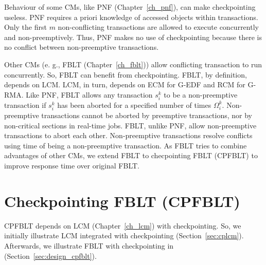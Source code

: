Behaviour of some CMs, like PNF (Chapter~\ref{ch_pnf}), can make checkpointing useless. PNF requires a priori knowledge of accessed objects within transactions. Only the first $m$ non-conflicting transactions are allowed to execute concurrently and non-preemptively. Thus, PNF makes no use of checkpointing because there is no conflict between non-preemptive transactions.

Other CMs (e. g., FBLT (Chapter~\ref{ch_fblt})) allow conflicting transaction to run concurrently. So, FBLT can benefit from checkpointing. FBLT, by definition, depends on LCM. LCM, in turn, depends
on ECM for G-EDF and RCM for G-RMA. Like PNF, FBLT allows any transaction $s_i^k$ to be a non-preemptive transaction if $s_i^k$ has been aborted for a specified number of times $\Omega_i^k$. Non-preemptive transactions cannot be aborted by preemptive transactions, nor by non-critical sections in real-time jobs. FBLT, unlike PNF, allow non-preemptive transactions to abort each other. Non-preemptive transactions resolve conflicts using time of being a non-preemptive transaction. As FBLT  tries to combine advantages of other CMs, we extend FBLT to checpointing FBLT (CPFBLT) to improve response time over original FBLT.
%
\section{Checkpointing FBLT (CPFBLT)}\label{sec:cpfblt_design}
%
CPFBLT depends on LCM (Chapter~\ref{ch_lcm}) with checkpointing. So, we initially illustrate LCM integrated with checkpointing (Section~\ref{sec:cplcm}). Afterwards, we illustrate FBLT with checkpointing in (Section~\ref{sec:design_cpfblt}).
%
